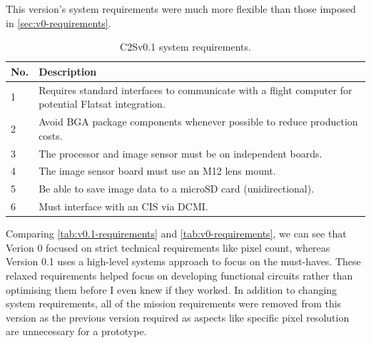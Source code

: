 This version's system requirements were much more flexible than those imposed in \autoref{sec:v0-requirements}.

\begin{table}[H]
    \centering
    \begin{tabular}{|l|p{10cm}|}
    \hline
    \textbf{No.} & \textbf{Description} \\
    \hline
    1 & Requires standard interfaces to communicate with a flight computer for potential Flatsat integration. \\
    \hline
    2 & Avoid BGA package components whenever possible to reduce production costs. \\
    \hline
    3 & The processor and image sensor must be on independent boards. \\
    \hline
    4 & The image sensor board must use an M12 lens mount. \\
    \hline
    5 & Be able to save image data to a microSD card (unidirectional). \\
    \hline
    6 & Must interface with an CIS via DCMI. \\
    \hline
    \end{tabular}
    \caption{C2Sv0.1 system requirements.}
    \label{tab:v0.1-requirements}
\end{table}

Comparing \autoref{tab:v0.1-requirements} and \autoref{tab:v0-requirements}, we can see that Verion 0 focused on strict technical requirements like pixel count, whereas Version 0.1 uses a high-level systems approach to focus on the must-haves. These relaxed requirements helped focus on developing functional circuits rather than optimising them before I even knew if they worked.
\nl
In addition to changing system requirements, all of the mission requirements were removed from this version as the previous version required as aspects like specific pixel resolution are unnecessary for a prototype.